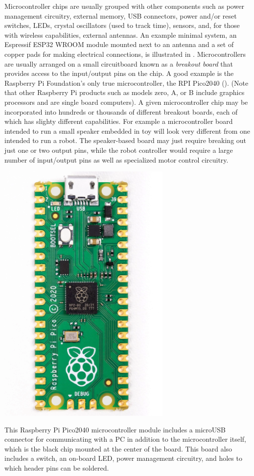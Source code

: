 Microcontroller chips are usually grouped with other components such as power management circuitry, external memory, USB connectors, power and/or reset switches, LEDs, crystal oscillators (used to track time), sensors, and, for those with wireless capabilities, external antennas. 
An example minimal system, an Espressif ESP32 WROOM module mounted next to an antenna and a set of copper pads for making electrical connections, is illustrated in .
Microcontrollers are usually arranged on a small circuitboard known as a \emph{breakout board} that provides access to the input/output pins on the chip. A good example is the Raspberry Pi Foundation's only true microcontroller, the RPI Pico2040 (). (Note that other Raspberry Pi products such as models zero, A, or B include graphics processors and are single board computers). 
A given microcontroller chip may be incorporated into hundreds or thousands of different breakout boards, each of which has slighty different capabilities.
For example a microcontroller board intended to run a small speaker embedded in toy will look very different from one intended to run a robot.
The speaker-based board may just require breaking out just one or two output pins, while the robot controller would require a large number of input/output pins as well as specialized motor control circuitry.

\begin{marginfigure}[-10cm]
	\begin{center}
		\includegraphics[width=\MFW]{Images/PICO2040.png}
		\caption[PICO2040 Microcontroller]{This Raspberry Pi Pico2040 microcontroller module includes a microUSB connector for communicating with a PC in addition to the microcontroller itself, which is the black chip mounted at the center of the board. This board also includes a switch, an on-board LED, power management circuitry, and holes to which header pins can be soldered.}
	\end{center}
\end{marginfigure}


